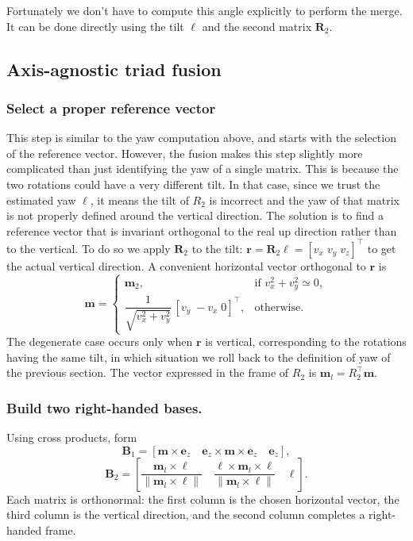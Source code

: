 \documentclass{IJCAS}
\begin{document}
 Fortunately we don't have to compute this angle explicitly to perform the merge. It can be done directly using the tilt $\boldsymbol{\ell}$ and the second matrix $\boldsymbol{R}_{2}$.

\subsection{Axis-agnostic triad fusion}
\label{sec:triad_fusion}

\subsubsection{Select a proper reference vector}
This step is similar to the yaw computation above, and starts with the selection of the reference vector. However, the fusion makes this step slightly more complicated than just identifying the yaw of a single matrix. This is because the two rotations could have a very different tilt. In that case, since we trust the estimated yaw $\ell$, it means the tilt of $R_2$ is incorrect and the yaw of that matrix is not properly defined around the vertical direction. The solution is to find a reference vector that is invariant orthogonal to the real up direction rather than to the vertical.
To do so we apply $\boldsymbol{R}_{2}$ to the tilt:
$\boldsymbol{r}=\boldsymbol{R}_{2}\boldsymbol{\ell}=[v_{x}\;v_{y}\;v_{z}]^{\top}$ to get the actual vertical direction.
A convenient horizontal vector orthogonal to $\boldsymbol{r}$ is
\[
  \boldsymbol{m}
  =
  \begin{cases}
    \boldsymbol{m}_2, &
      \text{if } v_{x}^{2}+v_{y}^{2}\simeq0,\\[6pt]
    \dfrac{1}{\sqrt{v_{x}^{2}+v_{y}^{2}}}\,[v_{y}\;-v_{x}\;0]^{\top},
    & \text{otherwise.}
  \end{cases}
\]
The degenerate case occurs only when $\boldsymbol{r}$ is vertical, corresponding to the rotations having the same tilt, in which situation we roll back to the definition of yaw of the previous section.  The vector
expressed in the frame of $R_{2}$ is
$\boldsymbol{m}_{l}=R_{2}^{\top}\boldsymbol{m}$.


\subsubsection{ Build two right-handed bases.}
Using cross products, form
\[
  \boldsymbol{B}_{1}
  =
  \left[
    \boldsymbol{m}\times\boldsymbol{e}_{z}\quad
    \boldsymbol{e}_{z}\times\boldsymbol{m}\times\boldsymbol{e}_{z}\quad
    \boldsymbol{e}_{z}
  \right],
\]
\[
  \boldsymbol{B}_{2}
  =
  \left[
    \frac{\boldsymbol{m}_{l}\times\boldsymbol{\ell}}
         {\|\boldsymbol{m}_{l}\times\boldsymbol{\ell}\|}\quad
    \frac{\boldsymbol{\ell}\times\boldsymbol{m}_{l}\times\boldsymbol{\ell}}
         {\|\boldsymbol{m}_{l}\times\boldsymbol{\ell}\|}\quad
    \boldsymbol{\ell}
  \right].
\]
Each matrix is orthonormal: the first column is the chosen horizontal
vector, the third column is the vertical direction, and the second
column completes a right-handed frame.
\end{document}
